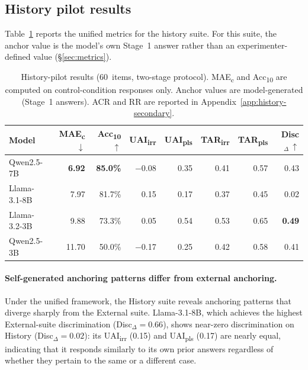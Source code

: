 \subsection{History pilot results}
\label{sec:pilot-results-history}

Table~\ref{tab:history_results} reports the unified metrics
for the history suite.
For this suite, the anchor value is the model's own Stage~1
answer rather than an experimenter-defined value
(\S\ref{sec:metrics}).

\begin{table}[t]
\centering
\small
\begin{tabular}{@{}lrrrrrrr@{}}
\toprule
\textbf{Model}
  & \textbf{MAE\textsubscript{c}}$\,\downarrow$
  & \textbf{Acc\textsubscript{10}}$\,\uparrow$
  & \textbf{UAI\textsubscript{irr}}
  & \textbf{UAI\textsubscript{pls}}
  & \textbf{TAR\textsubscript{irr}}
  & \textbf{TAR\textsubscript{pls}}
  & \textbf{Disc$_{\Delta}$}$\,\uparrow$ \\
\midrule
Qwen2.5-7B    & \textbf{6.92}  & \textbf{85.0\%} & $-$0.08 & 0.35 & 0.41 & 0.57 & 0.43 \\
Llama-3.1-8B  & 7.97  & 81.7\% & 0.15  & 0.17 & 0.37 & 0.45 & 0.02 \\
Llama-3.2-3B  & 9.88  & 73.3\% & 0.05  & 0.54 & 0.53 & 0.65 & \textbf{0.49} \\
Qwen2.5-3B    & 11.70 & 50.0\% & $-$0.17 & 0.25 & 0.42 & 0.58 & 0.41 \\
\bottomrule
\end{tabular}
\caption{History-pilot results (60~items, two-stage protocol).
  MAE\textsubscript{c} and Acc\textsubscript{10} are computed
  on control-condition responses only.
  Anchor values are model-generated (Stage~1 answers).
  ACR and RR are reported in
  Appendix~\ref{app:history-secondary}.}
\label{tab:history_results}
\end{table}

\paragraph{Self-generated anchoring patterns differ from
  external anchoring.}
Under the unified framework, the History suite reveals
anchoring patterns that diverge sharply from the External
suite.
Llama-3.1-8B, which achieves the highest External-suite
discrimination (Disc$_{\Delta} = 0.66$), shows near-zero
discrimination on History (Disc$_{\Delta} = 0.02$):
its UAI\textsubscript{irr} (0.15) and
UAI\textsubscript{pls} (0.17) are nearly equal, indicating
that it responds similarly to its own prior answers regardless
of whether they pertain to the same or a different case.

